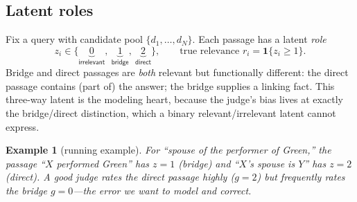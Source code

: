 \documentclass[11pt]{article}
\newtheorem{example}{Example}
\begin{document}
\subsection{Latent roles}
Fix a query with candidate pool $\{d_1,\dots,d_N\}$. Each passage has a latent \emph{role}
\begin{equation}
  z_i\in\{\underbrace{0}_{\textsf{irrelevant}},\ \underbrace{1}_{\textsf{bridge}},\ \underbrace{2}_{\textsf{direct}}\},
  \qquad \text{true relevance } r_i=\mathbf 1\{z_i\ge1\}.
\end{equation}
Bridge and direct passages are \emph{both} relevant but functionally different: the direct passage contains (part
of) the answer; the bridge supplies a linking fact. This three-way latent is the modeling heart, because the
judge's bias lives at exactly the bridge/direct distinction, which a binary relevant/irrelevant latent cannot
express.

\begin{example}[running example]
For ``spouse of the performer of Green,'' the passage ``$X$ performed Green'' has $z=1$ (bridge) and ``$X$'s
spouse is $Y$'' has $z=2$ (direct). A good judge rates the direct passage highly ($g{=}2$) but frequently rates
the bridge $g{=}0$---the error we want to model and correct.
\end{example}
\end{document}
